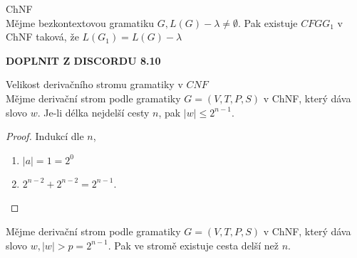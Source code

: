\documentclass[../main.tex]{subfiles}
\begin{document}
\begin{theorem}
    ChNF\\

    Mějme bezkontextovou gramatiku $G, L(G) - {\lambda} \neq \emptyset$. Pak existuje $CFG G_1$ v ChNF taková, že $L(G_1) = L(G) - {\lambda}$
\end{theorem}
\begin{example}
    \textbf{DOPLNIT Z DISCORDU 8.10}
\end{example}

\begin{theorem}
    Velikost derivačního stromu gramatiky v $CNF$\\

    Mějme derivační strom podle gramatiky $G = (V,T,P,S)$ v ChNF, který dáva slovo $w$. Je-li délka nejdelší cesty $n$,
    pak $|w| \leq 2^{n-1}$.
    \begin{proof}
        
        Indukcí dle $n$,
        \begin{enumerate}
            \item $|a| = 1 = 2^0$
            \item $2^{n-2} + 2^{n-2} = 2^{n-1}$.
        \end{enumerate}
    \end{proof}
    \begin{remark}
        Mějme derivační strom podle gramatiky $G = (V,T,P,S)$ v ChNF, který dáva slovo $w, |w| > p = 2^{n-1}$. Pak ve stromě existuje cesta delší než $n$.
    \end{remark}
\end{theorem}
\end{document}
